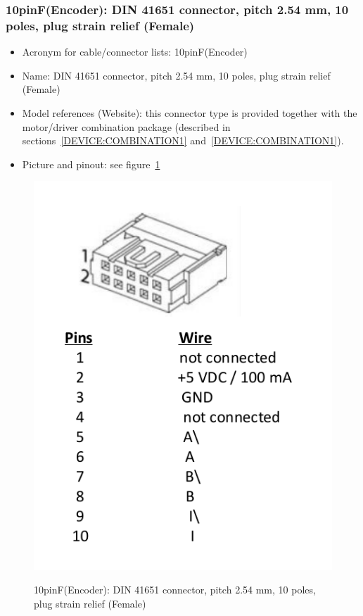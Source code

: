\subsubsection{10pinF(Encoder): DIN 41651 connector, pitch 2.54 mm, 10 poles, plug strain relief (Female)} \label{DEVICE:10pinF(Encoder)}
\begin{itemize}
  \item Acronym for cable/connector lists: 10pinF(Encoder)
  \item Name: DIN 41651 connector, pitch 2.54 mm, 10 poles, plug strain relief (Female)
  \item Model references (Website): this connector type is provided together with the motor/driver combination package (described in sections~\ref{DEVICE:COMBINATION1} and~\ref{DEVICE:COMBINATION1}).
  \item Picture and pinout: see figure~\ref{FIG:DEVICE10pinF(Encoder)}
\end{itemize}
\begin{figure}
  \centering
  \includegraphics[angle=90,width=1\columnwidth]{figs/body02/FIGDEVICE10pinF(Encoder).pdf}\\
  \caption[10pinF(Encoder): DIN 41651 connector, pitch 2.54 mm, 10 poles, plug strain relief (Female)]{10pinF(Encoder): DIN 41651 connector, pitch 2.54 mm, 10 poles, plug strain relief (Female)}
  \label{FIG:DEVICE10pinF(Encoder)}
\end{figure}
